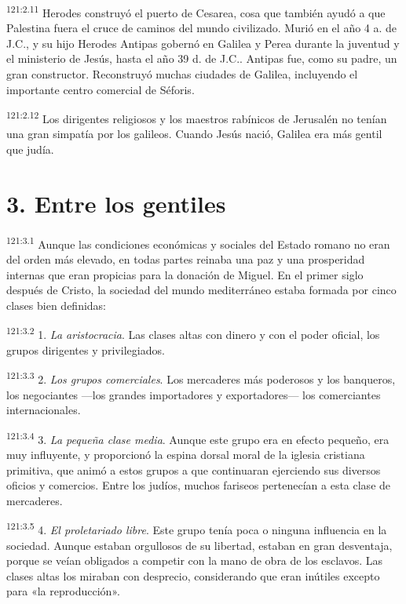 \par
\textsuperscript{121:2.11} Herodes construyó el puerto de Cesarea, cosa que también ayudó a que Palestina fuera el cruce de caminos del mundo civilizado. Murió en el año 4 a. de J.C., y su hijo Herodes Antipas gobernó en Galilea y Perea durante la juventud y el ministerio de Jesús, hasta el año 39 d. de J.C.. Antipas fue, como su padre, un gran constructor. Reconstruyó muchas ciudades de Galilea, incluyendo el importante centro comercial de Séforis.

\par
\textsuperscript{121:2.12} Los dirigentes religiosos y los maestros rabínicos de Jerusalén no tenían una gran simpatía por los galileos. Cuando Jesús nació, Galilea era más gentil que judía.

\section*{3. Entre los gentiles}
\par
\textsuperscript{121:3.1} Aunque las condiciones económicas y sociales del Estado romano no eran del orden más elevado, en todas partes reinaba una paz y una prosperidad internas que eran propicias para la donación de Miguel. En el primer siglo después de Cristo, la sociedad del mundo mediterráneo estaba formada por cinco clases bien definidas:

\par
\textsuperscript{121:3.2} 1. \textit{La aristocracia}. Las clases altas con dinero y con el poder oficial, los grupos dirigentes y privilegiados.

\par
\textsuperscript{121:3.3} 2. \textit{Los grupos comerciales}. Los mercaderes más poderosos y los banqueros, los negociantes ---los grandes importadores y exportadores--- los comerciantes internacionales.

\par
\textsuperscript{121:3.4} 3. \textit{La pequeña clase media}. Aunque este grupo era en efecto pequeño, era muy influyente, y proporcionó la espina dorsal moral de la iglesia cristiana primitiva, que animó a estos grupos a que continuaran ejerciendo sus diversos oficios y comercios. Entre los judíos, muchos fariseos pertenecían a esta clase de mercaderes.

\par
\textsuperscript{121:3.5} 4. \textit{El proletariado libre}. Este grupo tenía poca o ninguna influencia en la sociedad. Aunque estaban orgullosos de su libertad, estaban en gran desventaja, porque se veían obligados a competir con la mano de obra de los esclavos. Las clases altas los miraban con desprecio, considerando que eran inútiles excepto para «la reproducción».

